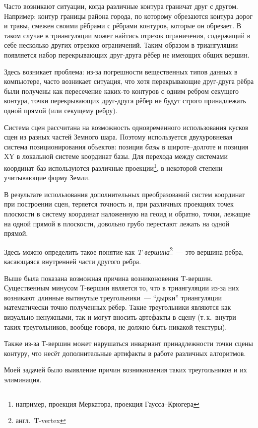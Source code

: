 \documentclass[a4paper,10pt,titlepage]{report}
\begin{document}
Часто возникают ситуации, когда различные контура граничат друг с другом.
Например: контур границы района города, по которому обрезаются контура дорог и травы,
смежен своими рёбрами с рёбрами контуров, которые он обрезает.
В таком случае в триангуляции может найтись отрезок ограничения,
содержащий в себе несколько других отрезков ограничений.
Таким образом в триангуляции появляется набор перекрывающих друг-друга рёбер не имеющих общих вершин.

Здесь возникает проблема: из-за погрешности вещественных типов данных в компьютере,
часто возникает ситуация, что хотя перекрывающие друг-друга рёбра были получены как пересечение
каких-то контуров с одним ребром секущего контура, 
точки перекрывающих друг-друга рёбер не будут строго принадлежать одной прямой (или секущему ребру).

Система сцен рассчитана на возможность одновременного использования кусков сцен из разных частей Земного шара.
Поэтому используется двухуровневая система позиционирования объектов: 
позиция \textit{базы} в широте--долготе и позиция XY в локальной системе координат базы.
Для перехода между системами координат баз используются различные 
проекции\footnote{например, проекция Меркатора, проекция Гаусса--Крюгера}, 
в некоторой степени учитывающие форму Земли.

В результате использования дополнительных преобразований систем координат при построении сцен, 
теряется точность 
и, при различных проекциях точек плоскости в систему координат наложенную на геоид и обратно,
точки, лежащие на одной прямой в плоскости, довольно грубо перестают лежать на одной прямой.

Здесь можно определить такое понятие как \textit{T-вершина}\footnote{англ.~T-vertex}~--- 
это вершина ребра, касающаяся внутренней части другого ребра.

Выше была показана возможная причина возниконовения T-вершин.
Существенным минусом Т-вершин является то, 
что в триангуляции из-за них возникают длинные вытянутые треугольники~--- 
``дырки'' триангуляции математически точно полученных рёбер.
Такие треугольники являются как визуально ненужными, 
так и могут вносить артефакты в сцену
(т.\,к.~внутри таких треугольников, вообще говоря, не должно быть никакой текстуры).

Также из-за Т-вершин может нарушаться инвариант принадлежности точки сцены контуру,
что несёт дополнительные артифакты в работе различных алгоритмов.

Моей задачей было выявление причин возникновения таких треугольников и их элиминация.
\end{document}
